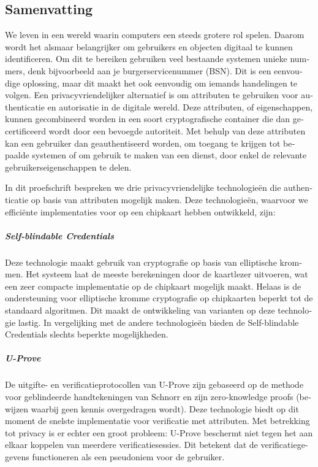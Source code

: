 \begin{otherlanguage}{dutch}

\chapter*{Samenvatting}

We leven in een wereld waarin computers een steeds grotere rol spelen. Daarom 
wordt het alsmaar belangrijker om gebruikers en objecten digitaal te kunnen
identificeren. Om dit te bereiken gebruiken veel bestaande systemen unieke 
nummers, denk bijvoorbeeld aan je burgerservicenummer (BSN). Dit is een 
eenvoudige oplossing, maar dit maakt het ook eenvoudig om iemands handelingen
te volgen. Een privacyvriendelijker alternatief is om attributen te gebruiken 
voor authenticatie en autorisatie in de digitale wereld. Deze attributen, of 
eigenschappen, kunnen gecombineerd worden in een soort cryptografische container
die dan gecertificeerd wordt door een bevoegde autoriteit. Met behulp van deze 
attributen kan een gebruiker dan geauthentiseerd worden, om toegang te krijgen 
tot bepaalde systemen of om gebruik te maken van een dienst, door enkel de 
relevante gebruikerseigenschappen te delen.

In dit proefschrift bespreken we drie privacyvriendelijke technologie\"{e}n die
authenticatie op basis van attributen mogelijk maken. Deze technologie\"{e}n, 
waarvoor we effici\"{e}nte implementaties voor op een chipkaart hebben 
ontwikkeld, zijn:

\paragraph{Self-blindable Credentials}
Deze technologie maakt gebruik van cryptografie op basis van elliptische
krommen. Het systeem laat de meeste berekeningen door de kaartlezer uitvoeren, 
wat een zeer compacte implementatie op de chipkaart mogelijk maakt. Helaas is 
de ondersteuning voor elliptische kromme cryptografie op chipkaarten beperkt 
tot de standaard algoritmen. Dit maakt de ontwikkeling van varianten op 
deze technologie lastig. In vergelijking met de andere technologie\"{e}n bieden
de Self-blindable Credentials slechts beperkte mogelijkheden.

\paragraph{U-Prove}
De uitgifte- en verificatieprotocollen van U-Prove zijn gebaseerd op de methode
voor geblindeerde handtekeningen van Schnorr en zijn zero-knowledge proofs 
(bewijzen waarbij geen kennis overgedragen wordt). Deze technologie biedt op dit
moment de snelste implementatie voor verificatie met attributen. Met
betrekking tot privacy is er echter een groot probleem: U-Prove beschermt niet 
tegen het aan elkaar koppelen van meerdere verificatiesessies. Dit betekent dat de verificatiegegevens functioneren als een pseudoniem voor de gebruiker.


\end{otherlanguage}
